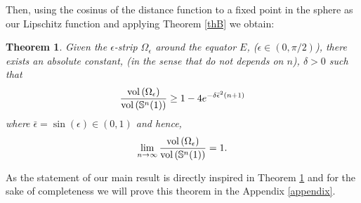 \documentclass[11pt,letterpaper]{amsart}
\newtheorem{theorem}{Theorem}[section]
\theoremstyle{definition}
\theoremstyle{remark}
\begin{document}
Then, using the cosinus of the distance function to a fixed point in the sphere as our Lipschitz function and applying Theorem \ref{thB} we obtain:

\begin{theorem}\label{teo:mitjana}
 Given the $\epsilon$-strip $\Omega_\epsilon$ around the equator $E$, ($\epsilon \in (0,\pi/2)$),  there exists an absolute constant, (in the sense that do not depends on $n$), $\delta>0$ such that
\begin{equation}\label{eq3}
\frac{{\rm vol}\left(\Omega_\epsilon\right)}{{\rm vol}\left(\mathbb{S}^n(1)\right)}\geq 1-4e^{-\delta\bar\epsilon^2(n+1)}
\end{equation}
 where $\bar\epsilon=\sin(\epsilon) \in (0,1)$ and hence,
 \begin{equation}\label{eq3.1}
\lim_{n\to \infty}\frac{{\rm vol}\left(\Omega_\epsilon\right)}{{\rm vol}\left(\mathbb{S}^n(1)\right)}=1.
\end{equation}   
\end{theorem}

 As  the statement of our main result is directly inspired in Theorem \ref{teo:mitjana} and for the sake of completeness we will prove this theorem in the Appendix \ref{appendix}.
\end{document}
